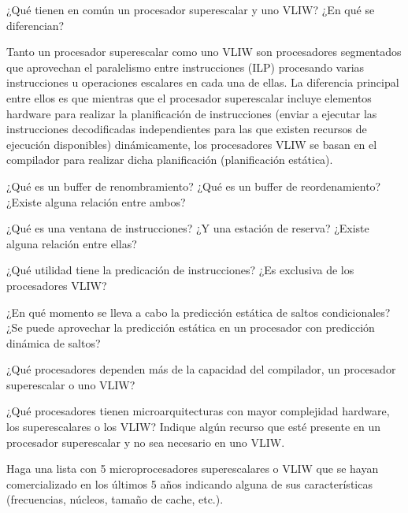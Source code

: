\begin{cuestion}
¿Qué tienen en común un procesador superescalar y uno VLIW? ¿En qué se diferencian?

Tanto un procesador superescalar como uno VLIW son procesadores segmentados que aprovechan el
paralelismo entre instrucciones (ILP) procesando varias instrucciones u operaciones escalares en cada una de
ellas. La diferencia principal entre ellos es que mientras que el procesador superescalar incluye elementos
hardware para realizar la planificación de instrucciones (enviar a ejecutar las instrucciones decodificadas
independientes para las que existen recursos de ejecución disponibles) dinámicamente, los procesadores
VLIW se basan en el compilador para realizar dicha planificación (planificación estática).
\end{cuestion}

\begin{cuestion}
   ¿Qué es un buffer de renombramiento? ¿Qué es un buffer de reordenamiento? ¿Existe alguna relación entre ambos? 
\end{cuestion}

\begin{cuestion}
   ¿Qué es una ventana de instrucciones? ¿Y una estación de reserva? ¿Existe alguna relación entre ellas? 
\end{cuestion}

\begin{cuestion}
    ¿Qué utilidad tiene la predicación de instrucciones? ¿Es exclusiva de los procesadores VLIW?
\end{cuestion}

\begin{cuestion}
¿En qué momento se lleva a cabo la predicción estática de saltos condicionales? ¿Se puede aprovechar la predicción estática en un procesador con predicción dinámica de saltos?
\end{cuestion}

\begin{cuestion}
    ¿Qué procesadores dependen más de la capacidad del compilador, un procesador superescalar o uno VLIW?
\end{cuestion}

\begin{cuestion}
    ¿Qué procesadores tienen microarquitecturas con mayor complejidad hardware, los superescalares o los VLIW\@? Indique algún recurso que esté presente en un procesador superescalar y no sea necesario en uno VLIW.

    Haga una lista con 5 microprocesadores superescalares o VLIW que se hayan comercializado en los últimos 5 años indicando alguna de sus características (frecuencias, núcleos, tamaño de cache, etc.).
\end{cuestion}
